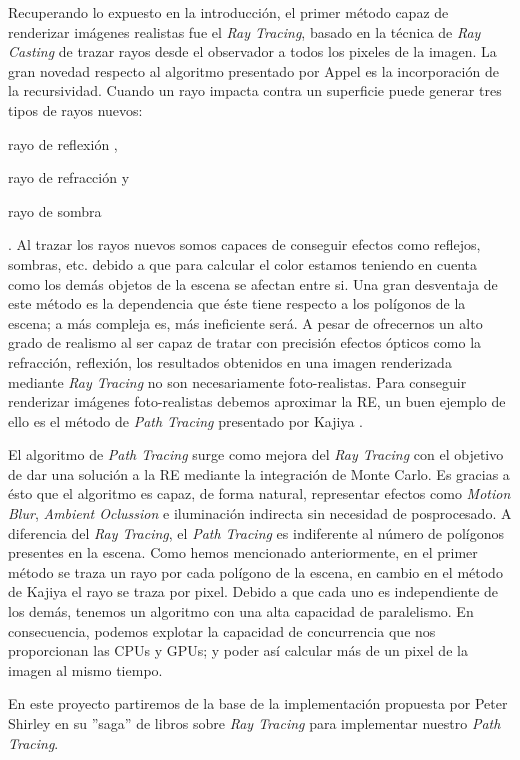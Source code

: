 \documentclass[titlepage,12pt]{report}
\begin{document}
Recuperando lo expuesto en la introducción, el primer método capaz de renderizar imágenes realistas fue el \textit{Ray Tracing}, basado en la técnica de \textit{Ray Casting} de trazar rayos desde el observador a todos los pixeles de la imagen. La gran novedad respecto al algoritmo presentado por Appel \cite{Appel1968} es la incorporación de la recursividad. Cuando un rayo impacta contra un superficie puede generar tres tipos de rayos nuevos: \begin{enumerate*}[label=\roman*)] \item rayo de reflexión \label{ray:reflected}, \item rayo de refracción y \item rayo de sombra \end{enumerate*}. Al trazar los rayos nuevos somos capaces de conseguir efectos como reflejos, sombras, etc. debido a que para calcular el color estamos teniendo en cuenta como los demás objetos de la escena se afectan entre si. Una gran desventaja de este método es la dependencia que éste tiene respecto a los polígonos de la escena; a más compleja es, más ineficiente será. A pesar de ofrecernos un alto grado de realismo al ser capaz de tratar con precisión efectos ópticos como la refracción, reflexión, los resultados obtenidos en una imagen renderizada mediante \textit{Ray Tracing} no son necesariamente foto-realistas. Para conseguir renderizar imágenes foto-realistas debemos aproximar la RE, un buen ejemplo de ello es el método de \textit{Path Tracing} presentado por Kajiya \cite{Kajiya1986}.

El algoritmo de \textit{Path Tracing} surge como mejora del \textit{Ray Tracing} con el objetivo de dar una solución a la RE mediante la integración de Monte Carlo. Es gracias a ésto que el algoritmo es capaz, de forma natural, representar efectos como \textit{Motion Blur}, \textit{Ambient Oclussion} e iluminación indirecta sin necesidad de posprocesado. A diferencia del \textit{Ray Tracing}, el \textit{Path Tracing} es indiferente al número de polígonos presentes en la escena. Como hemos mencionado anteriormente, en el primer método se traza un rayo por cada polígono de la escena, en cambio en el método de Kajiya el rayo se traza por pixel. Debido a que cada uno es independiente de los demás, tenemos un algoritmo con una alta capacidad de paralelismo. En consecuencia, podemos explotar la capacidad de concurrencia que nos proporcionan las CPUs y GPUs; y poder así calcular más de un pixel de la imagen al mismo tiempo.

En este proyecto partiremos de la base de la implementación propuesta por Peter Shirley en su ''saga'' de libros sobre \textit{Ray Tracing} \citep{Shirley2018a, Shirley2018b, Shirley2018b} para implementar nuestro \textit{Path Tracing}. 
\end{document}
